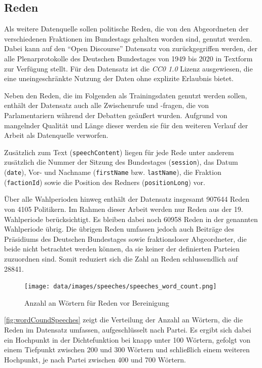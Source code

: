 \subsection*{Reden} \label{subsec:dataUnderstandingReden}

Als weitere Datenquelle sollen politische Reden, die von den Abgeordneten der verschiedenen Fraktionen im Bundestags gehalten worden sind, genutzt werden. Dabei kann auf den \enquote{Open Discourse} Datensatz von \textcite{richter_open_2021} zurückgegriffen werden, der alle Plenarprotokolle des Deutschen Bundestages von \num{1949} bis \num{2020} in Textform zur Verfügung stellt. Für den Datensatz ist die \textit{CC0 1.0} Lizenz ausgewiesen, die eine uneingeschränkte Nutzung der Daten ohne explizite Erlaubnis bietet.

Neben den Reden, die im Folgenden als Trainingsdaten genutzt werden sollen, enthält der Datensatz auch alle Zwischenrufe und -fragen, die von Parlamentariern während der Debatten geäußert wurden. Aufgrund von mangelnder Qualität und Länge dieser werden sie für den weiteren Verlauf der Arbeit als Datenquelle verworfen.

Zusätzlich zum Text (\texttt{speechContent}) liegen für jede Rede unter anderem zusätzlich die Nummer der Sitzung des Bundestages (\texttt{session}), das Datum (\texttt{date}), Vor- und Nachname (\texttt{firstName} bzw. \texttt{lastName}), die Fraktion (\texttt{factionId}) sowie die Position des Redners (\texttt{positionLong}) vor.

Über alle Wahlperioden hinweg enthält der Datensatz insgesamt \num{907644} Reden von \num{4105} Politikern. Im Rahmen dieser Arbeit werden nur Reden aus der 19. Wahlperiode berücksichtigt. Es bleiben dabei noch \num{60958} Reden in der genannten Wahlperiode übrig. Die übrigen Reden umfassen jedoch auch Beiträge des Präsidiums des Deutschen Bundestages sowie fraktionsloser Abgeordneter, die beide nicht betrachtet werden können, da sie keiner der definierten Parteien zuzuordnen sind. Somit reduziert sich die Zahl an Reden schlussendlich auf \num{28841}.

\begin{figure}[H]
    \centering
    \texttt{[image: data/images/speeches/speeches\_word\_count.png]}
    \caption{Anzahl an Wörtern für Reden vor Bereinigung} \label{fig:wordCoundSpeeches}
\end{figure}

\autoref{fig:wordCoundSpeeches} zeigt die Verteilung der Anzahl an Wörtern, die die Reden im Datensatz umfassen, aufgeschlüsselt nach Partei. Es ergibt sich dabei ein Hochpunkt in der Dichtefunktion bei knapp unter 100 Wörtern, gefolgt von einem Tiefpunkt zwischen \num{200} und \num{300} Wörtern und schließlich einem weiteren Hochpunkt, je nach Partei zwischen 400 und 700 Wörtern.

